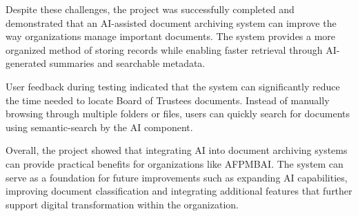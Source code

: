 Despite these challenges, the project was successfully completed and demonstrated that an AI-assisted document archiving system can improve the way organizations manage important documents. The system provides a more organized method of storing records while enabling faster retrieval through AI-generated summaries and searchable metadata.

User feedback during testing indicated that the system can significantly reduce the time needed to locate Board of Trustees documents. Instead of manually browsing through multiple folders or files, users can quickly search for documents using semantic-search by the AI component.

Overall, the project showed that integrating AI into document archiving systems can provide practical benefits for organizations like AFPMBAI. The system can serve as a foundation for future improvements such as expanding AI capabilities, improving document classification and integrating additional features that further support digital transformation within the organization.